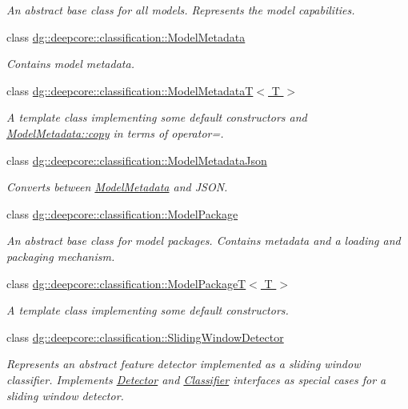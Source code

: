 \begin{DoxyCompactItemize}
\begin{DoxyCompactList}\small\item\em An abstract base class for all models. Represents the model capabilities. \end{DoxyCompactList}\item 
class \hyperlink{classdg_1_1deepcore_1_1classification_1_1_model_metadata}{dg\+::deepcore\+::classification\+::\+Model\+Metadata}
\begin{DoxyCompactList}\small\item\em Contains model metadata. \end{DoxyCompactList}\item 
class \hyperlink{classdg_1_1deepcore_1_1classification_1_1_model_metadata_t}{dg\+::deepcore\+::classification\+::\+Model\+Metadata\+T$<$ T $>$}
\begin{DoxyCompactList}\small\item\em A template class implementing some default constructors and \hyperlink{group___classification_module_ga851d179b56e5c32b25512df0141f3ca2}{Model\+Metadata\+::copy} in terms of operator=. \end{DoxyCompactList}\item 
class \hyperlink{classdg_1_1deepcore_1_1classification_1_1_model_metadata_json}{dg\+::deepcore\+::classification\+::\+Model\+Metadata\+Json}
\begin{DoxyCompactList}\small\item\em Converts between \hyperlink{classdg_1_1deepcore_1_1classification_1_1_model_metadata}{Model\+Metadata} and J\+S\+ON. \end{DoxyCompactList}\item 
class \hyperlink{classdg_1_1deepcore_1_1classification_1_1_model_package}{dg\+::deepcore\+::classification\+::\+Model\+Package}
\begin{DoxyCompactList}\small\item\em An abstract base class for model packages. Contains metadata and a loading and packaging mechanism. \end{DoxyCompactList}\item 
class \hyperlink{classdg_1_1deepcore_1_1classification_1_1_model_package_t}{dg\+::deepcore\+::classification\+::\+Model\+Package\+T$<$ T $>$}
\begin{DoxyCompactList}\small\item\em A template class implementing some default constructors. \end{DoxyCompactList}\item 
class \hyperlink{classdg_1_1deepcore_1_1classification_1_1_sliding_window_detector}{dg\+::deepcore\+::classification\+::\+Sliding\+Window\+Detector}
\begin{DoxyCompactList}\small\item\em Represents an abstract feature detector implemented as a sliding window classifier. Implements \hyperlink{classdg_1_1deepcore_1_1classification_1_1_detector}{Detector} and \hyperlink{classdg_1_1deepcore_1_1classification_1_1_classifier}{Classifier} interfaces as special cases for a sliding window detector. \end{DoxyCompactList}\end{DoxyCompactItemize}
